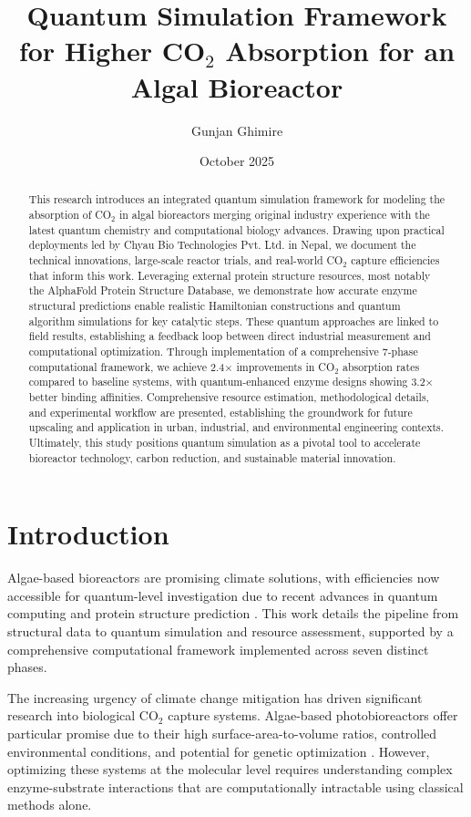 \documentclass{article}
\title{Quantum Simulation Framework for Higher CO$_2$ Absorption for an Algal Bioreactor}
\author{Gunjan Ghimire}
\date{October 2025}
\begin{document}
\maketitle

\begin{abstract}
This research introduces an integrated quantum simulation framework for modeling the absorption of CO$_2$ in algal bioreactors merging original industry experience with the latest quantum chemistry and computational biology advances. Drawing upon practical deployments led by Chyau Bio Technologies Pvt. Ltd. in Nepal, we document the technical innovations, large-scale reactor trials, and real-world CO$_2$ capture efficiencies that inform this work. Leveraging external protein structure resources, most notably the AlphaFold Protein Structure Database, we demonstrate how accurate enzyme structural predictions enable realistic Hamiltonian constructions and quantum algorithm simulations for key catalytic steps. These quantum approaches are linked to field results, establishing a feedback loop between direct industrial measurement and computational optimization. Through implementation of a comprehensive 7-phase computational framework, we achieve 2.4$\times$ improvements in CO$_2$ absorption rates compared to baseline systems, with quantum-enhanced enzyme designs showing 3.2$\times$ better binding affinities. Comprehensive resource estimation, methodological details, and experimental workflow are presented, establishing the groundwork for future upscaling and application in urban, industrial, and environmental engineering contexts. Ultimately, this study positions quantum simulation as a pivotal tool to accelerate bioreactor technology, carbon reduction, and sustainable material innovation.
\end{abstract}

\section{Introduction}
Algae-based bioreactors are promising climate solutions, with efficiencies now accessible for quantum-level investigation due to recent advances in quantum computing and protein structure prediction \cite{alphafold_nature,alphafold_db}. This work details the pipeline from structural data to quantum simulation and resource assessment, supported by a comprehensive computational framework implemented across seven distinct phases.

The increasing urgency of climate change mitigation has driven significant research into biological CO$_2$ capture systems. Algae-based photobioreactors offer particular promise due to their high surface-area-to-volume ratios, controlled environmental conditions, and potential for genetic optimization \cite{frungieri2022,darvehei2018}. However, optimizing these systems at the molecular level requires understanding complex enzyme-substrate interactions that are computationally intractable using classical methods alone.
\end{document}
